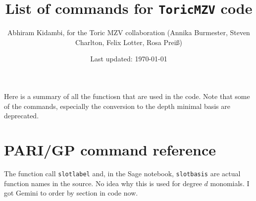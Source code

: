 \documentclass[12pt]{amsproc}
\title{List of commands for \texttt{ToricMZV} code}
\author[]{Abhiram Kidambi, for the Toric MZV collaboration (Annika Burmester, Steven Charlton, Felix Lotter, Rosa Prei\ss)}
\date{Last updated: \today}
\newcommand{\code}[1]{\nolinkurl{#1}}
\begin{document}
\maketitle

\tableofcontents

Here is a summary of all the functiosn that are used in the code. Note that some of the commands, especially the conversion to the depth minimal basis are deprecated. 

\section{PARI/GP command reference}
The function call \code{slotlabel} and, in the Sage notebook, \code{slotbasis} are actual function names in the source.  No idea why this is used for degree $d$ monomials.
I got Gemini to order by section in code now. 
\vspace{0.5cm}
\begingroup\scriptsize\sloppy
\setlength\LTpre{0pt}\setlength\LTpost{0pt}
\end{document}
